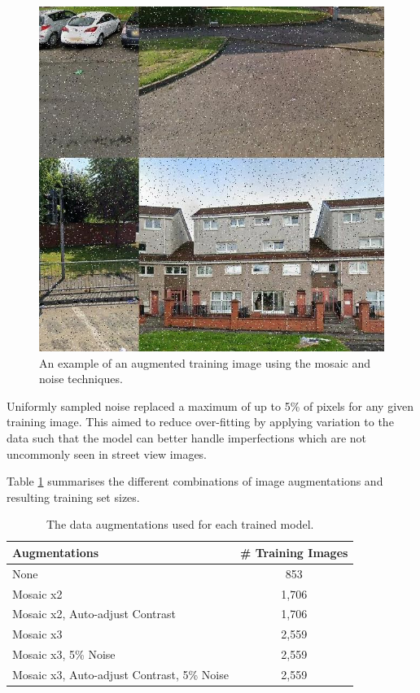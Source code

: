 \documentclass{thesis}
\begin{document}
\begin{figure}[h]
    \centering
    \includegraphics[scale=0.4]{images/mosaic-noise-example.jpg}
    \caption{An example of an augmented training image using the mosaic and noise techniques.}
    \label{fig:mosaic-noise-image}
\end{figure}

Uniformly sampled noise replaced a maximum of up to 5\% of pixels for any given training image. This aimed to reduce over-fitting by applying variation to the data such that the model can better handle imperfections which are not uncommonly seen in street view images.

Table \ref{table:model-augmentations} summarises the different combinations of image augmentations and resulting training set sizes.

\begin{table}[ht!]
    \centering
    \begin{tabular}{|l| |c|} 
     \hline
      \textbf{Augmentations} & \textbf{\# Training Images} \\
     \hline\hline
     None & 853 \\
     Mosaic x2 & 1,706  \\
     Mosaic x2, Auto-adjust Contrast & 1,706  \\
     Mosaic x3 & 2,559\\
     Mosaic x3, 5\% Noise & 2,559 \\
     Mosaic x3, Auto-adjust Contrast, 5\% Noise & 2,559 \\
     \hline
    \end{tabular}
    \hspace{100mm}
    \caption{The data augmentations used for each trained model.}
    \label{table:model-augmentations}
\end{table}
\end{document}
